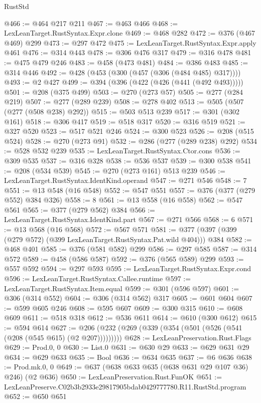 \begin{lexlean}{RustStd}
\begin{coremodule}
@466 := @464 @217 @211
@467 := @463 @466
@468 := LexLeanTarget.RustSyntax.Expr.clone
@469 := @468 @282
@472 := @376 (@467 @469) @299
@473 := @297 @472
@475 := LexLeanTarget.RustSyntax.Expr.apply @461
@476 := @314 @443
@478 := @306 @476 @317
@479 := @316 @478
@481 := @475 @479 @246
@483 := @458 (@473 @481)
@484 := @386 @483
@485 := @314 @446
@492 := @428 (@453 (@300 (@457 (@306 (@484 @485) @317))))
@493 := @2 @427
@499 := @394 (@396 (@422 (@426 (@441 (@492 @493)))))
@501 := @208 (@375 @499)
@503 := @270 (@273 @57)
@505 := @277 (@284 @219)
@507 := @277 (@289 @239)
@508 := @278 @402
@513 := @505 (@507 (@277 (@508 @238) @292))
@515 := @503 @513 @239
@517 := @301 (@302 @161)
@518 := @306 @417
@519 := @518 @317
@520 := @316 @519
@521 := @327 @520
@523 := @517 @521 @246
@524 := @300 @523
@526 := @208 (@515 @524)
@528 := @270 (@273 @91)
@532 := @286 (@277 (@289 @238) @292)
@534 := @528 @532 @239
@535 := LexLeanTarget.RustSyntax.Ctor.cons
@536 := @309 @535
@537 := @316 @328
@538 := @536 @537
@539 := @300 @538
@541 := @208 (@534 @539)
@545 := @270 (@273 @161) @513 @239
@546 := LexLeanTarget.RustSyntax.IdentKind.operand
@547 := @271 @546
@548 := 7
@551 := @13 @548 (@16 @548)
@552 := @547 @551
@557 := @376 (@377 (@279 @552) @384 @326)
@558 := 8
@561 := @13 @558 (@16 @558)
@562 := @547 @561
@565 := @377 (@279 @562) @384
@566 := LexLeanTarget.RustSyntax.IdentKind.part
@567 := @271 @566
@568 := 6
@571 := @13 @568 (@16 @568)
@572 := @567 @571
@581 := @377 (@397 (@399 (@279 @572) (@399 LexLeanTarget.RustSyntax.Pat.wild @404))) @384
@582 := @468 @401
@585 := @376 (@581 @582) @299
@586 := @297 @585
@587 := @314 @572
@589 := @458 (@586 @587)
@592 := @376 (@565 @589) @299
@593 := @557 @592
@594 := @297 @593
@595 := LexLeanTarget.RustSyntax.Expr.cond
@596 := LexLeanTarget.RustSyntax.Callee.runtime
@597 := LexLeanTarget.RustSyntax.Item.equal
@599 := @301 (@596 @597)
@601 := @306 (@314 @552)
@604 := @306 (@314 @562) @317
@605 := @601 @604
@607 := @599 @605 @246
@608 := @595 @607
@609 := @300 @315
@610 := @608 @609
@611 := @518 @318
@612 := @536 @611
@614 := @610 (@300 @612)
@615 := @594 @614
@627 := @206 (@232 (@269 (@339 (@354 (@501 (@526 (@541 (@208 (@545 @615) (@2 @207)))))))))
@628 := LexLeanPreservation.Rust.Flags
@629 := Prod.{0, 0}
@630 := List.{0}
@631 := @630 @29
@633 := @629 @631 @29
@634 := @629 @633
@635 := Bool
@636 := @634 @635
@637 := @6 @636
@638 := Prod.mk.{0, 0}
@649 := @637 (@638 @633 @635 (@638 @631 @29 @107 @36) @246) (@2 @636)
@650 := LexLeanPreservation.Rust.FunOK
@651 := LexLeanPreserve.C02b3b2933e29817905bdab0429777780.R11.RustStd.program
@652 := @650 @651

\end{coremodule}
\end{lexlean}
